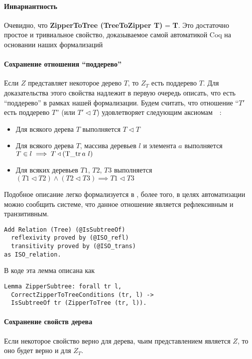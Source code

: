 \paragraph{Инвариантность}
Очевидно, что \textbf{ZipperToTree (TreeToZipper T)} = \textbf{T}. Это достаточно простое и тривиальное свойство, доказываемое самой автоматикой Coq на основании наших формализаций

\paragraph{Сохранение отношения ``поддерево''}
Если $Z$ представляет некоторое дерево $T$, то $Z_T$ есть поддерево $T$. Для доказательства этого свойства надлежит в первую очередь описать, что есть ``поддерево'' в рамках нашей формализации. Будем считать, что отношение ``$T'$ есть поддерево $T$'' (или $T' \triangleleft T$) удовлетворяет следующим аксиомам~\autocite{Okasaki1996}~\autocite{Cormen2002}:
\begin{itemize}
\item Для всякого дерева $T$ выполняется $T \triangleleft T$
\item Для всякого дерева $T$, массива деревьев $l$ и элемента $a$ выполняется $T \in l \implies T \triangleleft (\operatorname{T\_tr} a \ l)$
\item Для всяких деревьев $T1$, $T2$, $T3$ выполняется $(T1 \triangleleft T2) \wedge (T2 \triangleleft T3) \implies T1 \triangleleft T3$
\end{itemize}

Подобное описание легко формализуется в \tcoq, более того, в целях автоматизации можно сообщить системе, что данное отношение является рефлексивным и транзитивным.

\begin{Verbatim}[fontsize=\small]
Add Relation (Tree) (@IsSubtreeOf)
  reflexivity proved by (@ISO_refl)
  transitivity proved by (@ISO_trans)
as ISO_relation.
\end{Verbatim}

В коде эта лемма описана как
\begin{Verbatim}[fontsize=\small]
Lemma ZipperSubtree: forall tr l,
  CorrectZipperToTreeConditions (tr, l) ->
  IsSubtreeOf tr (ZipperToTree (tr, l)).
\end{Verbatim}

\paragraph{Сохранение свойств дерева}
Если некоторое свойство верно для дерева, чьим представлением является $Z$, то оно будет верно и для $Z_T$. 

